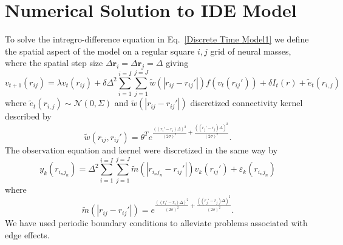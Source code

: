\documentclass[onecolumn,draftcls]{IEEEtran}
\begin{document}
\section{Numerical Solution to IDE Model}\label{Space Discretization}
To solve the intregro-difference equation in Eq.~\ref{Discrete Time Model1} we define the spatial aspect of the model on a regular square $i,j$ grid of neural masses, where the spatial step size $\Delta \mathbf{r}_i = \Delta \mathbf{r}_j = \Delta $ giving
\begin{equation}\label{discrete space}
	v_{t+1}\left(r_{ij}\right) =  \lambda v_t(r_{ij}) + \delta \Delta^2 \sum_{i=1}^{i=I}{\sum_{j=1}^{j=J}{\tilde{w}\left( |r_{ij}-r_{ij}'| \right)f\left( v_t\left( r_{ij}'\right) \right)} } + \delta I_t\left(r\right) + \tilde{e}_t(r_{i,j})
\end{equation}
where $\tilde{e}_t(r_{i,j}) \sim \mathcal{N}\left(0,\Sigma\right)$ and $\tilde{w}(|r_{ij}-r_{ij}'|)$ discretized connectivity kernel described by
\begin{equation}\label{Discrete Connectivity Kernel}
	\tilde{w}(r_{ij},r_{ij}') = \theta^T e^{\frac{\left(\left(r_i'-r_i\right)\Delta\right)^2}{(2\sigma)^2} + \frac{\left(\left(r_j'-r_j\right)\Delta\right)^2}{(2\sigma)^2}}.
\end{equation}
The observation equation and kernel were discretized in the same way by
\begin{equation}\label{Discrete Observation Equation}
    y_k\left(r_{i_n j_n}\right) = \Delta^2\sum_{i=1}^{i=I}\sum_{j=1}^{j=J} \tilde{m}( |r_{i_n j_n}-r_{ij}'| ) v_k\left(r_{ij}'\right)  + \varepsilon_k( r_{i_n j_n})
\end{equation}
where
\begin{equation}\label{Discrete Observation Kernel}
	\tilde{m}(|r_{ij}-r_{ij}'|) = e^{\frac{\left(\left(r_i'-r_i\right)\Delta\right)^2}{(2\sigma)^2} + \frac{\left(\left(r_j'-r_j\right)\Delta\right)^2}{(2\sigma)^2}}.
\end{equation}
We have used periodic boundary conditions to alleviate problems associated with edge effects.
\end{document}
